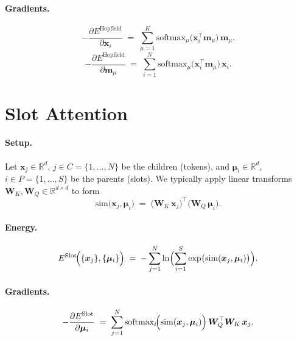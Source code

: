 \documentclass{article}
\begin{document}
\paragraph{Gradients.}
\begin{equation}
-\frac{\partial E^{\mathrm{Hopfield}}}{\partial \bm{x}_i}
\;=\;
\sum_{\mu=1}^K
\text{softmax}_{\mu}\!\bigl(\bm{x}_i^\top \bm{m}_\mu\bigr)\,
\bm{m}_\mu.
\end{equation}
\begin{equation}
-\frac{\partial E^{\mathrm{Hopfield}}}{\partial \bm{m}_\mu}
\;=\;
\sum_{i=1}^N
\text{softmax}_{\mu}\!\bigl(\bm{x}_i^\top \bm{m}_\mu\bigr)\,
\bm{x}_i.
\end{equation}

\section{Slot Attention}

\paragraph{Setup.}
Let \(\bm{x}_j \in \mathbb{R}^d\), \(j\in C=\{1,\ldots,N\}\) be the children (tokens), and \(\bm{\mu}_i \in \mathbb{R}^d\), \(i \in P=\{1,\ldots,S\}\) be the parents (slots).  
We typically apply linear transforms \(\bm{W}_K,\bm{W}_Q \in \mathbb{R}^{d \times d}\) to form
\[
\mathrm{sim}\bigl(\bm{x}_j,\bm{\mu}_i\bigr)
\;=\;
\bigl(\bm{W}_K\,\bm{x}_j\bigr)^\top
\bigl(\bm{W}_Q\,\bm{\mu}_i\bigr).
\]

\paragraph{Energy.}
\begin{equation}
E^{\mathrm{Slot}}\!\Bigl(\{\bm{x}_j\}, \{\bm{\mu}_i\}\Bigr)
\;=\;
-\sum_{j=1}^N
\ln \Bigl(\sum_{i=1}^S
\exp \bigl(\mathrm{sim}(\bm{x}_j,\bm{\mu}_i)\bigr)\Bigr).
\end{equation}

\paragraph{Gradients.}
\begin{equation}
    -\frac{\partial E^{\mathrm{Slot}}}{\partial \bm{\mu}_i}
    \;=\;
    \sum_{j=1}^N
    \text{softmax}_{i}\!\Bigl(\mathrm{sim}(\bm{x}_j,\bm{\mu}_i)\Bigr)\,
    \bm{W}_Q^\top \bm{W}_K\,\bm{x}_j.
    \end{equation}
    
\end{document}
